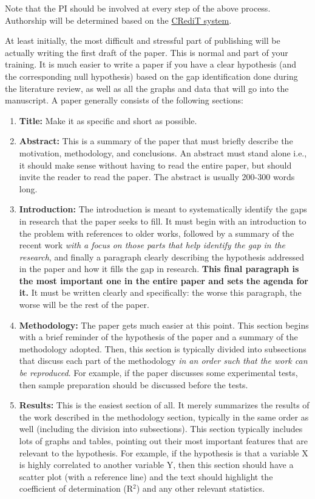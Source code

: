 \documentclass[12pt]{article}
\begin{document}
Note that the PI should be involved at every step of the above process. Authorship will be determined based on the \href{https://www.elsevier.com/authors/policies-and-guidelines/credit-author-statement}{CRediT system}.

At least initially, the most difficult and stressful part of publishing will be actually writing the first draft of the paper. This is normal and part of your training. It is much easier to write a paper if you have a clear hypothesis (and the corresponding null hypothesis) based on the gap identification done during the literature review, as well as all the graphs and data that will go into the manuscript. A paper generally consists of the following sections:

\begin{enumerate}
	\item \textbf{Title:} Make it as specific and short as possible.
	\item \textbf{Abstract:} This is a summary of the paper that must briefly describe the motivation, methodology, and conclusions. An abstract must stand alone i.e., it should make sense without having to read the entire paper, but should invite the reader to read the paper. The abstract is usually 200-300 words long.
	\item \textbf{Introduction:} The introduction is meant to systematically identify the gaps in research that the paper seeks to fill. It must begin with an introduction to the problem with references to older works, followed by a summary of the recent work \textit{with a focus on those parts that help identify the gap in the research}, and finally a paragraph clearly describing the hypothesis addressed in the paper and how it fills the gap in research. \textbf{This final paragraph is the most important one in the entire paper and sets the agenda for it.} It must be written clearly and specifically: the worse this paragraph, the worse will be the rest of the paper. 
	\item \textbf{Methodology:} The paper gets much easier at this point. This section begins with a brief reminder of the hypothesis of the paper and a summary of the methodology adopted. Then, this section is typically divided into subsections that discuss each part of the methodology \textit{in an order such that the work can be reproduced}. For example, if the paper discusses some experimental tests, then sample preparation should be discussed before the tests.
	\item \textbf{Results:} This is the easiest section of all. It merely summarizes the results of the work described in the methodology section, typically in the same order as well (including the division into subsections). This section typically includes lots of graphs and tables, pointing out their most important features that are relevant to the hypothesis. For example, if the hypothesis is that a variable X is highly correlated to another variable Y, then this section should have a scatter plot (with a reference line) and the text should highlight the coefficient of determination (R$^2$) and any other relevant statistics.

\end{enumerate}
\end{document}

